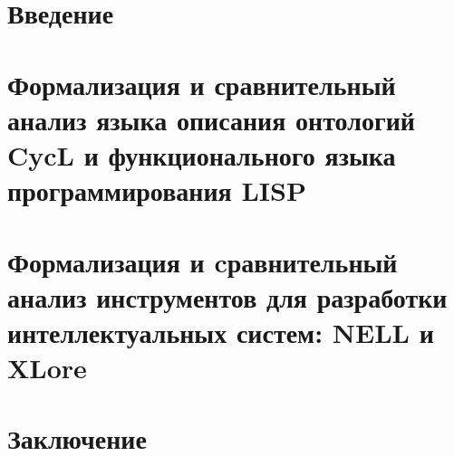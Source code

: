 \section*{Введение}


\newpage
\section{Формализация и сравнительный анализ языка описания онтологий CycL и функционального языка программирования LISP}


\newpage
\section{Формализация и cравнительный анализ инструментов для разработки интеллектуальных систем: NELL и XLore}


\newpage
\section*{Заключение}

